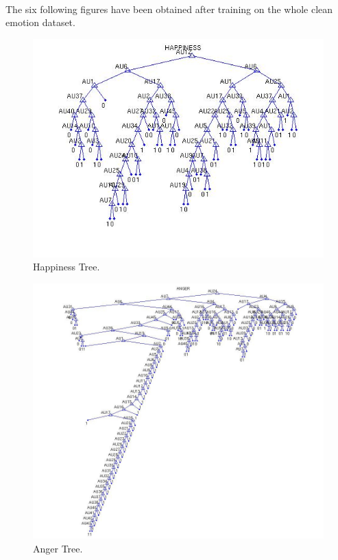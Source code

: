 \documentclass[a4paper,12pt,oneside,final]{report}
\newenvironment{changemargin}[2]{\begin{list}{}{%
\setlength{\topsep}{0pt}%
\setlength{\leftmargin}{0pt}%
\setlength{\rightmargin}{0pt}%
\setlength{\listparindent}{\parindent}%
\setlength{\itemindent}{\parindent}%
\setlength{\parsep}{0pt plus 1pt}%
\addtolength{\leftmargin}{#1}%
\addtolength{\rightmargin}{#2}%
}\item }{\end{list}}
\begin{document}
\paragraph{}
The six following figures have been obtained after training on the whole clean emotion dataset.
\label{ch:trees}
\begin{figure}[!h]
\begin{changemargin}{-20mm}{-20mm}
\center
\includegraphics[scale=1]{happiness.jpg}
\caption{Happiness Tree.}
\end{changemargin}
\end{figure}

\begin{figure}[h]
\begin{changemargin}{-20mm}{-20mm}
\begin{center}
\includegraphics[scale=0.6]{anger.jpg}
\end{center}
\caption{Anger Tree.}
\end{changemargin}
\end{figure}
\end{document}
